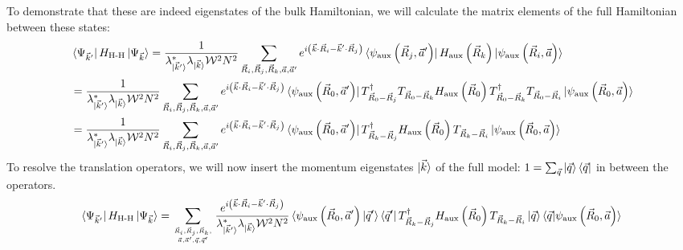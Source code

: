 \documentclass{report}
\numberwithin{equation}{section}
\begin{document}
\begin{appendices}
To demonstrate that these are indeed eigenstates of the bulk Hamiltonian, we will calculate the matrix elements of the full Hamiltonian between these states:
\begin{equation}\begin{aligned}
	&\bra{\Psi_{\vec k^\prime}}H_\text{H-H} \ket{\Psi_{\vec k}} = \frac{1}{\lambda^*_{\ket{\vec k^\prime}} \lambda_{\ket{\vec k}} \mathcal{W}^2 N^2}\sum_{\vec R_i, \vec R_j, \vec R_k, \vec a, \vec a^\prime}e^{i\left(\vec{k}\cdot\vec{R}_i - \vec{k}^\prime\cdot\vec{R}_j\right)} \bra{\psi_\text{aux}\left(\vec R_j, \vec a^\prime\right)} H_\text{aux}\left(\vec R_k\right) \ket{\psi_\text{aux}\left(\vec R_i, \vec a\right)}\\
	&= \frac{1}{\lambda^*_{\ket{\vec k^\prime}} \lambda_{\ket{\vec k}} \mathcal{W}^2 N^2}\sum_{\vec R_i, \vec R_j, \vec R_k, \vec a, \vec a^\prime}e^{i\left(\vec{k}\cdot\vec{R}_i - \vec{k}^\prime\cdot\vec{R}_j\right)} \bra{\psi_\text{aux}\left(\vec R_0, \vec a^\prime\right)} T^\dagger_{\vec R_0 - \vec R_j} T_{\vec R_0 - \vec R_k} H_\text{aux}\left(\vec R_0\right) T^\dagger_{\vec R_0 - \vec R_k} T_{\vec R_0 - \vec R_i} \ket{\psi_\text{aux}\left(\vec R_0, \vec a\right)}\\
	&= \frac{1}{\lambda^*_{\ket{\vec k^\prime}} \lambda_{\ket{\vec k}} \mathcal{W}^2 N^2}\sum_{\vec R_i, \vec R_j, \vec R_k, \vec a, \vec a^\prime}e^{i\left(\vec{k}\cdot\vec{R}_i - \vec{k}^\prime\cdot\vec{R}_j\right)} \bra{\psi_\text{aux}\left(\vec R_0, \vec a^\prime\right)} T^\dagger_{\vec R_k - \vec R_j} H_\text{aux}\left(\vec R_0\right) T_{\vec R_k - \vec R_i} \ket{\psi_\text{aux}\left(\vec R_0, \vec a\right)}
\end{aligned}\end{equation}
To resolve the translation operators, we will now insert the momentum eigenstates \(\ket{\vec k}\) of the full model: \(1 = \sum_{\vec q}\ket{\vec q}\bra{\vec q}\) in between the operators.
\begin{equation}\begin{aligned}
	\bra{\Psi_{\vec k^\prime}}H_\text{H-H} \ket{\Psi_{\vec k}} &= \sum_{\vec R_i, \vec R_j, \vec R_k, \atop{\vec a, \vec a^\prime, \vec q, \vec q^\prime}}\frac{e^{i\left(\vec{k}\cdot\vec{R}_i - \vec{k}^\prime\cdot\vec{R}_j\right)}}{\lambda^*_{\ket{\vec k^\prime}} \lambda_{\ket{\vec k}} \mathcal{W}^2 N^2} \braket{\psi_\text{aux}\left(\vec R_0, \vec a^\prime\right)| \vec q^\prime}\bra{\vec q^\prime} T^\dagger_{\vec R_k - \vec R_j} H_\text{aux}\left(\vec R_0\right) T_{\vec R_k - \vec R_i}  \ket{\vec q}\braket{\vec q | \psi_\text{aux}\left(\vec R_0, \vec a\right)}\\

\end{aligned}
\end{equation}
\end{appendices}
\end{document}
